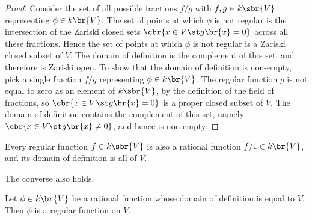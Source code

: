 \begin{proof}
Consider the set of all possible fractions $ f / g $ with $ f, g \in k\sbr{V} $ representing $ \phi \in k\br{V} $. The set of points at which $ \phi $ is not regular is the intersection of the Zariski closed sets $ \cbr{x \in V \st g\br{x} = 0} $ across all these fractions. Hence the set of points at which $ \phi $ is not regular is a Zariski closed subset of $ V $. The domain of definition is the complement of this set, and therefore is Zariski open. To show that the domain of definition is non-empty, pick a single fraction $ f / g $ representing $ \phi \in k\br{V} $. The regular function $ g $ is not equal to zero as an element of $ k\sbr{V} $, by the definition of the field of fractions, so $ \cbr{x \in V \st g\br{x} = 0} $ is a proper closed subset of $ V $. The domain of definition contains the complement of this set, namely $ \cbr{x \in V \st g\br{x} \ne 0} $, and hence is non-empty.
\end{proof}

\begin{note*}
Every regular function $ f \in k\sbr{V} $ is also a rational function $ f / 1 \in k\br{V} $, and its domain of definition is all of $ V $.
\end{note*}

\pagebreak

The converse also holds.

\begin{lemma}
\label{lem:rationalregular}
Let $ \phi \in k\br{V} $ be a rational function whose domain of definition is equal to $ V $. Then $ \phi $ is a regular function on $ V $.
\end{lemma}

